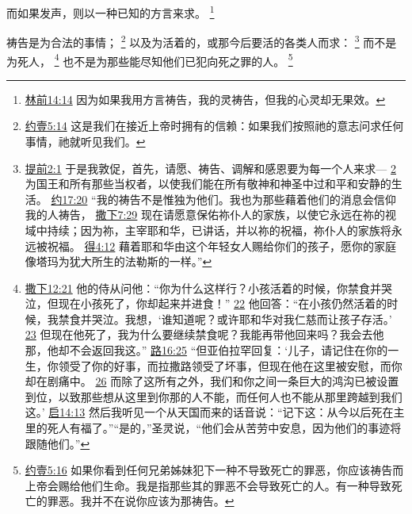 \documentclass[12pt, a4paper, oneside]{ctexart}
\newcounter{parnum}[section]
\newcommand{\N}{%
   \noindent\refstepcounter{parnum}%
    \makebox[\parindent][l]{\textbf{\arabic{parnum}.}}}
\begin{document}
	而如果发声，则以一种已知的方言来求。
	\footnote {
		\href{https://biblehub.com/1_corinthians/14-14.htm}{林前14:14} 因为如果我用方言祷告，我的灵祷告，但我的心灵却无果效。
	}

\N 祷告是为合法的事情；
	\footnote {
		\href{https://biblehub.com/1_john/5-14.htm}{约壹5:14} 这是我们在接近上帝时拥有的信赖：如果我们按照祂的意志问求任何事情，祂就听见我们。
	}
	以及为活着的，或那今后要活的各类人而求：
	\footnote {
		\href{https://biblehub.com/1_timothy/2-1.htm}{提前2:1} 于是我敦促，首先，请愿、祷告、调解和感恩要为每一个人来求---
		\href{https://biblehub.com/1_timothy/2-2.htm}{2} 为国王和所有那些当权者，以使我们能在所有敬神和神圣中过和平和安静的生活。
		\href{https://biblehub.com/john/17-20.htm}{约17:20} “我的祷告不是惟独为他们。我也为那些藉着他们的消息会信仰我的人祷告，
		\href{https://biblehub.com/2_samuel/7-29.htm}{撒下7:29} 现在请愿意保佑祢仆人的家族，以使它永远在祢的视域中持续；因为祢，主宰耶和华，已讲话，并以祢的祝福，祢仆人的家族将永远被祝福。
		\href{https://biblehub.com/ruth/4-12.htm}{得4:12} 藉着耶和华由这个年轻女人赐给你们的孩子，愿你的家庭像塔玛为犹大所生的法勒斯的一样。”
	}
	而不是为死人，
	\footnote {
		\href{https://biblehub.com/2_samuel/12-21.htm}{撒下12:21} 他的侍从问他：“你为什么这样行？小孩活着的时候，你禁食并哭泣，但现在小孩死了，你却起来并进食！”
		\href{https://biblehub.com/2_samuel/12-22.htm}{22} 他回答：“在小孩仍然活着的时候，我禁食并哭泣。我想，‘谁知道呢？或许耶和华对我仁慈而让孩子存活。’
		\href{https://biblehub.com/2_samuel/12-23.htm}{23} 但现在他死了，我为什么要继续禁食呢？我能再带他回来吗？我会去他那，他却不会返回我这。”
		\href{https://biblehub.com/luke/16-25.htm}{路16:25} “但亚伯拉罕回复：‘儿子，请记住在你的一生，你领受了你的好事，而拉撒路领受了坏事，但现在他在这里被安慰，而你却在剧痛中。
		\href{https://biblehub.com/luke/16-26.htm}{26} 而除了这所有之外，我们和你之间一条巨大的鸿沟已被设置到位，以致那些想从这里到你那的人不能，而任何人也不能从那里跨越到我们这。’
		\href{https://biblehub.com/revelation/14-13.htm}{启14:13} 然后我听见一个从天国而来的话音说：“记下这：从今以后死在主里的死人有福了。”“是的，”圣灵说，“他们会从苦劳中安息，因为他们的事迹将跟随他们。”
	}
	也不是为那些能尽知他们已犯向死之罪的人。
	\footnote {
		\href{https://biblehub.com/1_john/5-16.htm}{约壹5:16} 如果你看到任何兄弟姊妹犯下一种不导致死亡的罪恶，你应该祷告而上帝会赐给他们生命。我是指那些其的罪恶不会导致死亡的人。有一种导致死亡的罪恶。我并不在说你应该为那祷告。
	}
\end{document}
